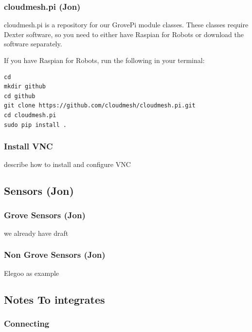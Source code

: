\subsubsection{cloudmesh.pi (Jon)}\label{cloudmesh.pi-jon}

cloudmesh.pi is a repository for our GrovePi module classes. These
classes require Dexter software, so you need to either have Raspian for
Robots or download the software separately.

If you have Raspian for Robots, run the following in your terminal:

\begin{verbatim}
cd
mkdir github
cd github
git clone https://github.com/cloudmesh/cloudmesh.pi.git
cd cloudmesh.pi
sudo pip install .
\end{verbatim}

\subsubsection{Install VNC}\label{install-vnc}

describe how to install and configure VNC

\subsection{Sensors (Jon)}\label{sensors-jon}

\subsubsection{Grove Sensors (Jon)}\label{grove-sensors-jon}

we already have draft

\subsubsection{Non Grove Sensors (Jon)}\label{non-grove-sensors-jon}

Elegoo as example

\subsection{Notes To integrates}\label{notes-to-integrates}

\subsubsection{Connecting}\label{connecting}

